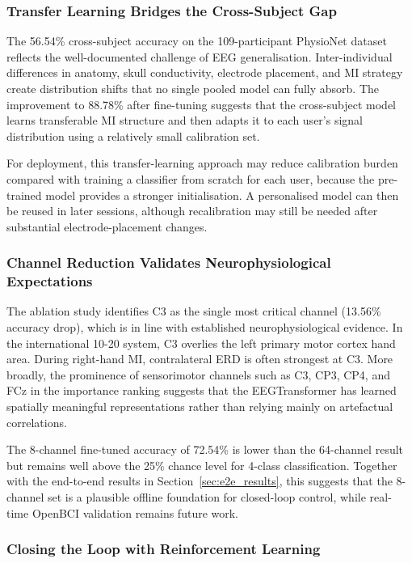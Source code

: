 \documentclass[12pt, a4paper]{article}
\begin{document}
\subsubsection{Transfer Learning Bridges the Cross-Subject Gap}

The 56.54\% cross-subject accuracy on the 109-participant PhysioNet dataset reflects the well-documented challenge of EEG generalisation. Inter-individual differences in anatomy, skull conductivity, electrode placement, and MI strategy create distribution shifts that no single pooled model can fully absorb. The improvement to 88.78\% after fine-tuning suggests that the cross-subject model learns transferable MI structure and then adapts it to each user's signal distribution using a relatively small calibration set.

For deployment, this transfer-learning approach may reduce calibration burden compared with training a classifier from scratch for each user, because the pre-trained model provides a stronger initialisation. A personalised model can then be reused in later sessions, although recalibration may still be needed after substantial electrode-placement changes.

\subsubsection{Channel Reduction Validates Neurophysiological Expectations}

The ablation study identifies C3 as the single most critical channel (13.56\% accuracy drop), which is in line with established neurophysiological evidence. In the international 10-20 system, C3 overlies the left primary motor cortex hand area. During right-hand MI, contralateral ERD is often strongest at C3. More broadly, the prominence of sensorimotor channels such as C3, CP3, CP4, and FCz in the importance ranking suggests that the EEGTransformer has learned spatially meaningful representations rather than relying mainly on artefactual correlations.

The 8-channel fine-tuned accuracy of 72.54\% is lower than the 64-channel result but remains well above the 25\% chance level for 4-class classification. Together with the end-to-end results in Section~\ref{sec:e2e_results}, this suggests that the 8-channel set is a plausible offline foundation for closed-loop control, while real-time OpenBCI validation remains future work.

\subsubsection{Closing the Loop with Reinforcement Learning}
\end{document}
